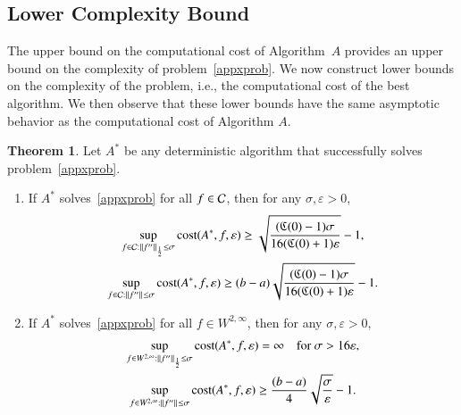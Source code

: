 \documentclass[review]{elsarticle}
\newcommand{\abstol}{\varepsilon}
\theoremstyle{definition}
\renewcommand{\cw}{W}
\newtheorem{theorem}{Theorem}
\begin{document}
\subsection{Lower Complexity Bound} \label{subsec:appxcomp}

The upper bound on the computational cost of Algorithm~$A$ provides an upper
bound on the complexity of problem~\eqref{appxprob}. We now construct lower
bounds on the complexity of the problem, i.e., the computational cost of the
best algorithm. We then observe that these lower bounds have the same asymptotic
behavior as the computational cost of Algorithm $A$.

\begin{theorem}
	Let $A^*$ be any deterministic algorithm that successfully solves problem~\eqref{appxprob}.
	
	\begin{enumerate}
		\renewcommand{\labelenumi}{\roman{enumi}.}
		\item  If $A^*$ solves~\eqref{appxprob} for all $f \in \mathcal{C}$, then for any $\sigma, \abstol >0$,
		\begin{subequations} \label{lowbdC}
		\begin{gather}
		\sup_{f \in \cc : \norm[\frac12]{f''} \le\sigma } \cost(A^*,f,\abstol) \ge \sqrt{\frac{(\fC(0)-1)\sigma}{16(\fC(0)+1)\abstol}} -1, \label{lowbdChalf}\\
		\sup_{f \in \cc : \norm{f''} \le\sigma } \cost(A^*,f,\abstol) \ge (b-a)\sqrt{\frac{(\fC(0)-1)\sigma}{16(\fC(0)+1)\abstol}} -1 \label{lowbdCinf}.
		\end{gather}
		\end{subequations}
		
		\item If $A^*$ solves~\eqref{appxprob} for all $f \in  \cw^{2,\infty}$, then for any $\sigma, \abstol >0$,
		\begin{subequations} \label{lowbdW}
		\begin{gather}
		\sup_{f \in \cw^{2,\infty} : \norm[\frac12]{f''} \le \sigma} \cost(A^*,f,\abstol) = \infty \quad \text{for } \sigma > 16 \abstol, \label{lowbdWhalf}\\
		\sup_{f \in \cw^{2,\infty} : \norm{f''} \le\sigma } \cost(A^*,f,\abstol) \ge \frac{(b-a)}{4} \sqrt{\frac{\sigma}{\abstol}} - 1.  \label{lowbdWinf}
		\end{gather}
		\end{subequations}
				
	\end{enumerate}
	\label{thm:A_cost}
\end{theorem}
\end{document}
